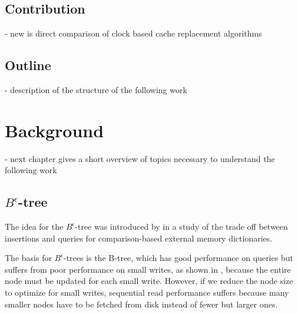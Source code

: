 \documentclass[
	12pt,
	a4paper,
	abstract,
	bibliography=totoc,
	chapterprefix,
	headings=openright,
	numbers=endperiod,
	parskip=half,
	twoside,
]{scrreprt}
\begin{document}
\section{Contribution}
- new is direct comparison of clock based cache replacement algorithms\\

\section{Outline}
- description of the structure of the following work\\


\chapter{Background}
\label{cha:background}


- next chapter gives a short overview of topics necessary to understand the following work\\

\section{$B^{\epsilon}$-tree}


The idea for the $B^{\epsilon}$-tree was introduced by \cite{brodal2003lower} in a study of the trade off between insertions and queries for comparison-based external memory dictionaries.

The basis for $B^{\epsilon}$-trees is the B-tree, which has good performance on queries but suffers from poor performance on small writes, as shown in \cite{bender2015introduction}, 
because the entire node must be updated for each small write.
However, if we reduce the node size to optimize for small writes, sequential read performance suffers because many smaller nodes have to be fetched from disk instead of fewer but larger ones.
\end{document}
